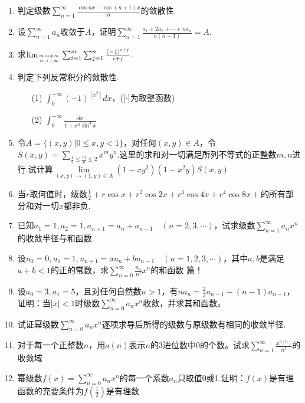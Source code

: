 \begin{enumerate}
	\item 判定级数$\sum_{n=1}^{\infty} \frac{\cos n x-\cos (n+1) x}{n}$的敛散性.
	\item 设$\sum_{n=1}^{\infty} a_{n}$收敛于$A$，证明$\sum_{n=1}^{\infty} \frac{a_{1}+2 a_{2}+\cdots+n a_{n}}{n(n+1)}=A$.
	
	\item 求$\lim _{m \rightarrow+\infty \atop n \rightarrow+\infty} \sum_{i=1}^{m} \sum_{j=1}^{n} \frac{(-1)^{i+j}}{i+j}$.
	\item 判定下列反常积分的敛散性.
	\begin{enumerate}
		\item [(1)]$\int_{0}^{+\infty}(-1)^{\left[x^{2}\right]} d x$，([$\cdot$]为取整函数)
		\item [(2)]$\int_{0}^{+\infty} \frac{d x}{1+x^{a} \sin ^{2} x}$
	\end{enumerate}
	
	\item 令$A=\{(x, y) | 0 \leqslant x, y<1\}$，对任何$(x,y)\in A$，令$S(x, y)=\sum_{\frac{1}{2} \leq \frac{m}{n} \leqslant 2} x^{m} y^{n}$.这里的求和对一切满足所列不等式的正整数$m,n$进行.试计算$\lim\limits _{(x, y) \rightarrow(1, y) \in A}\left(1-x y^{2}\right)\left(1-x^{2} y\right) S(x, y)$
	\item 当$r$取何值时，级数$\frac{1}{2}+r \cos x+r^{2} \cos 2 x+r^{3} \cos 4 x+r^{4} \cos 8 x+$的所有部分和对一切$x$都非负.
	
	\item 已知$a_{1}=1, a_{2}=1, a_{n+1}=a_{n}+a_{n-1} \quad(n=2,3, \cdots)$，试求级数$\sum_{n=1}^{\infty} a_{n} x^{n}$的收敛半径与和函数.
	
	\item 设$u_{0}=0, u_{1}=1, u_{n+1}=a u_{n}+b u_{n-1} \quad(n=1,2,3, \cdots)$，其中$a,b$是满足$a+b<1$的正的常数，求$\sum_{n=0}^{\infty} \frac{u_{n}}{n !} x^{n}$的和函数
	篇！
	
	\item 设$a_{0}=3, a_{1}=5$，且对任何自然数$n>1$，有$n a_{n}=\frac{2}{3} a_{n-1}-(n-1) a_{n-1}$，证明：当$|x|<1$时级数$\sum_{n=0}^{\infty} a_{n} x^{n}$收敛，并求其和函数。
	
	\item 试证幂级数$\sum_{n=0}^{\infty} a_{n} x^{n}$逐项求导后所得的级数与原级数有相同的收敛半径.
	\item 对于每一个正整数$n$，用$a(n)$表示$n$的3进位数中0的个数。试求$\sum_{n=1}^{\infty} \frac{x^{a(n)}}{n^{3}}$的收敛域
	\item 幂级数$f(x)=\sum_{n=0}^{\infty} a_{n} x^{n}$的每一个系数$a_{n}$只取值0或1.证明：$f(x)$是有理函数的充要条件为$f(\frac{1}{2})$是有理数


\end{enumerate}
